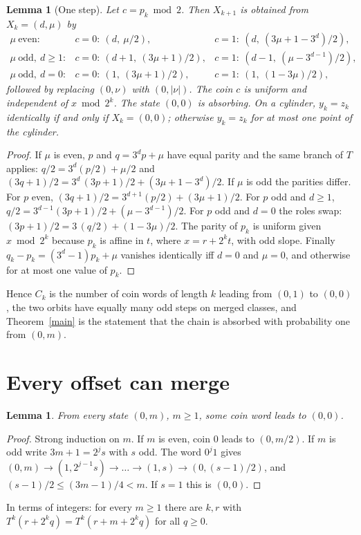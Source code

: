 \documentclass[11pt]{article}
\newtheorem{lemma}[theorem]{Lemma}
\theoremstyle{remark}
\begin{document}
\begin{lemma}[One step]\label{step}
Let $c=p_k \bmod 2$. Then $X_{k+1}$ is obtained from $X_k=(d,\mu)$ by
\[
\begin{array}{lll}
\mu\ \text{even:} & c=0:\ (d,\ \mu/2), & c=1:\ (d,\ (3\mu+1-3^d)/2),\\
\mu\ \text{odd},\ d\ge1: & c=0:\ (d+1,\ (3\mu+1)/2), & c=1:\ (d-1,\ (\mu-3^{d-1})/2),\\
\mu\ \text{odd},\ d=0: & c=0:\ (1,\ (3\mu+1)/2), & c=1:\ (1,\ (1-3\mu)/2),
\end{array}
\]
followed by replacing $(0,\nu)$ with $(0,|\nu|)$. The coin $c$ is uniform and independent of
$x \bmod 2^k$. The state $(0,0)$ is absorbing. On a cylinder, $y_k=z_k$ identically if and only if
$X_k=(0,0)$; otherwise $y_k=z_k$ for at most one point of the cylinder.
\end{lemma}
\begin{proof}
If $\mu$ is even, $p$ and $q=3^dp+\mu$ have equal parity and the same branch of $T$ applies:
$q/2=3^d(p/2)+\mu/2$ and $(3q+1)/2=3^d\,(3p+1)/2+(3\mu+1-3^d)/2$. If $\mu$ is odd the parities
differ. For $p$ even, $(3q+1)/2=3^{d+1}(p/2)+(3\mu+1)/2$. For $p$ odd and $d\ge1$,
$q/2=3^{d-1}(3p+1)/2+(\mu-3^{d-1})/2$. For $p$ odd and $d=0$ the roles swap:
$(3p+1)/2=3\,(q/2)+(1-3\mu)/2$. The parity of $p_k$ is uniform given $x\bmod 2^k$ because $p_k$ is
affine in $t$, where $x=r+2^kt$, with odd slope. Finally $q_k-p_k=(3^d-1)p_k+\mu$ vanishes
identically iff $d=0$ and $\mu=0$, and otherwise for at most one value of $p_k$.
\end{proof}

Hence $C_k$ is the number of coin words of length $k$ leading from $(0,1)$ to $(0,0)$, the two
orbits have equally many odd steps on merged classes, and Theorem~\ref{main} is the statement that
the chain is absorbed with probability one from $(0,m)$.

\section{Every offset can merge}
\begin{lemma}\label{offsets}
From every state $(0,m)$, $m\ge1$, some coin word leads to $(0,0)$.
\end{lemma}
\begin{proof}
Strong induction on $m$. If $m$ is even, coin $0$ leads to $(0,m/2)$. If $m$ is odd write
$3m+1=2^js$ with $s$ odd. The word $0^j1$ gives
$(0,m)\to(1,2^{j-1}s)\to\dots\to(1,s)\to(0,(s-1)/2)$, and $(s-1)/2\le(3m-1)/4<m$. If $s=1$ this is
$(0,0)$.
\end{proof}
In terms of integers: for every $m\ge1$ there are $k,r$ with $T^k(r+2^kq)=T^k(r+m+2^kq)$ for all
$q\ge0$.
\end{document}
